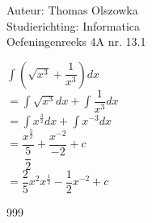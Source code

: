\documentclass[a4paper]{article}
\newcommand{\dint}{\displaystyle\int}
\begin{document}
\noindent \large Auteur: Thomas Olszowka \\
\noindent \large Studierichting: Informatica \\
\noindent \large Oefeningenreeks 4A nr. 13.1  \\



\medskip

\normalsize

$\dint \left(\sqrt{x^3} + \dfrac{1}{x^3}\right) dx$ \\

$= \dint \sqrt{x^3} dx + \dint \dfrac{1}{x^3} dx$ \\

$= \dint x^{\tfrac{3}{2}} dx + \dint x^{-3} dx$ \\

$= \dfrac{x^{\tfrac{5}{2}}}{\dfrac{5}{2}} + \dfrac{x^{-2}}{-2} + c$ \\

$= \dfrac{2}{5}x^2x^{\tfrac{1}{2}} - \dfrac{1}{2} x^{-2} + c$ \\


\begin{thebibliography}{999}
\end{thebibliography}
\end{document}
